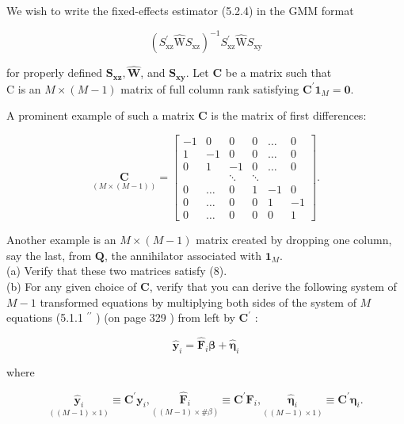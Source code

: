 \documentclass[10pt]{article}
\begin{document}
We wish to write the fixed-effects estimator (5.2.4) in the GMM format


\begin{equation*}
\left(S_{\mathrm{xz}}^{\prime} \widehat{\mathrm{W}} S_{\mathrm{xz}}\right)^{-1} S_{\mathrm{xz}}^{\prime} \widehat{\mathrm{W}} S_{\mathrm{xy}} \tag{7}
\end{equation*}


for properly defined $\mathbf{S}_{\mathbf{x z}}, \widehat{\mathbf{W}}$, and $\mathbf{S}_{\mathbf{x y}}$. Let $\mathbf{C}$ be a matrix such that\\
C is an $M \times(M-1)$ matrix of full column rank satisfying $\mathbf{C}^{\prime} \mathbf{1}_{M}=\mathbf{0}$.

A prominent example of such a matrix $\mathbf{C}$ is the matrix of first differences:

$$
\underset{(M \times(M-1))}{\mathbf{C}}=\left[\begin{array}{rrrrrr}
-1 & 0 & 0 & 0 & \ldots & 0 \\
1 & -1 & 0 & 0 & \ldots & 0 \\
0 & 1 & -1 & 0 & \ldots & 0 \\
& & \ddots & \ddots & & \\
0 & \ldots & 0 & 1 & -1 & 0 \\
0 & \ldots & 0 & 0 & 1 & -1 \\
0 & \ldots & 0 & 0 & 0 & 1
\end{array}\right] .
$$

Another example is an $M \times(M-1)$ matrix created by dropping one column, say the last, from $\mathbf{Q}$, the annihilator associated with $\mathbf{1}_{M}$.\\
(a) Verify that these two matrices satisfy (8).\\
(b) For any given choice of $\mathbf{C}$, verify that you can derive the following system of $M-1$ transformed equations by multiplying both sides of the system of $M$ equations (5.1.1 ${ }^{\prime \prime}$ ) (on page 329 ) from left by $\mathbf{C}^{\prime}$ :


\begin{equation*}
\hat{\mathbf{y}}_{i}=\widehat{\mathbf{F}}_{i} \boldsymbol{\beta}+\hat{\boldsymbol{\eta}}_{i} \tag{9}
\end{equation*}


where

$$
\underset{((M-1) \times 1)}{\hat{\mathbf{y}}_{i}} \equiv \mathbf{C}^{\prime} \mathbf{y}_{i}, \underset{((M-1) \times \# \beta)}{\widehat{\mathbf{F}}_{i}} \equiv \mathbf{C}^{\prime} \mathbf{F}_{i}, \underset{((M-1) \times 1)}{\hat{\boldsymbol{\eta}}_{i}} \equiv \mathbf{C}^{\prime} \boldsymbol{\eta}_{i} .
$$
\end{document}
